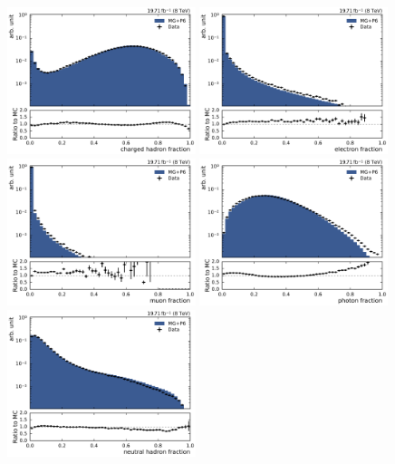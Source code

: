\begin{figure}[htbp]
    \centering
    \includegraphics[width=0.49\textwidth]{figures/measurement/jet_constituent_chargedHadronFraction.pdf}\hfill
    \includegraphics[width=0.49\textwidth]{figures/measurement/jet_constituent_electronFraction.pdf}
    \includegraphics[width=0.49\textwidth]{figures/measurement/jet_constituent_muonFraction.pdf}\hfill
    \includegraphics[width=0.49\textwidth]{figures/measurement/jet_constituent_neutralEMFraction.pdf}
    \includegraphics[width=0.49\textwidth]{figures/measurement/jet_constituent_neutralHadronFraction.pdf}

\end{figure}
